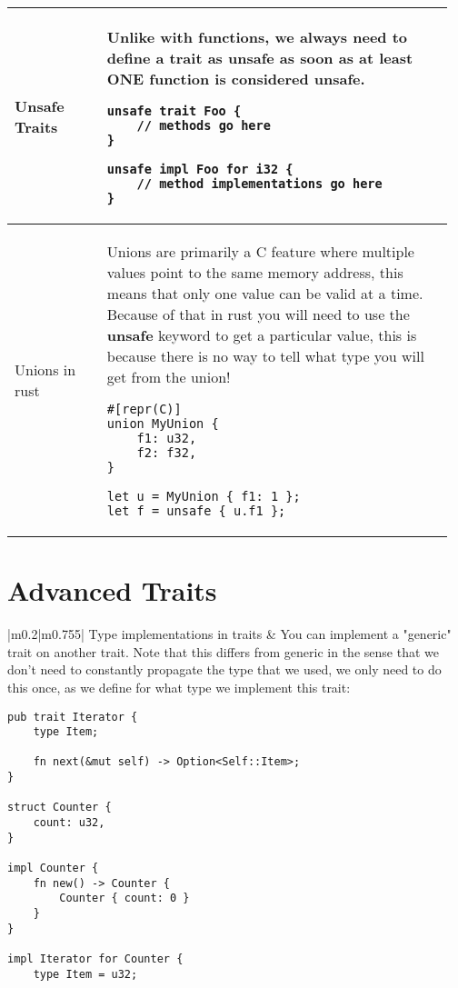 \documentclass[main.tex,fontsize=8pt,paper=a4,paper=portrait,DIV=calc,]{scrartcl}
\begin{document}
\begin{table}[ht!]
\begin{tabular}{|m{0.2\linewidth}|m{0.755\linewidth}|}
\hline
Unsafe Traits & 
Unlike with functions, we \textbf{always need to define a trait as unsafe as soon as at least ONE function is considered unsafe.}\newline
\begin{lstlisting}
unsafe trait Foo {
    // methods go here
}

unsafe impl Foo for i32 {
    // method implementations go here
}
\end{lstlisting}\\
\hline
Unions in rust & 
Unions are primarily a C feature where multiple values point to the same memory address, this means that only one value can be valid at a time.\newline
Because of that in rust you will need to use the \textbf{unsafe} keyword to get a particular value, this is because there is no way to tell what type you will get from the union!\newline
\begin{lstlisting}
#[repr(C)]
union MyUnion {
    f1: u32,
    f2: f32,
}

let u = MyUnion { f1: 1 };
let f = unsafe { u.f1 };
\end{lstlisting}\\
\hline
\end{tabular}
\section{Advanced Traits}
\begin{tabular}{|m{0.2\linewidth}|m{0.755\linewidth}|}
\hline
Type implementations in traits & 
You can implement a "generic" trait on another trait.\newline
Note that this differs from generic in the sense that we don't need to constantly propagate the type that we used, we only need to do this once, as we define for what type we implement this trait:\newline
\begin{lstlisting}
pub trait Iterator {
    type Item;

    fn next(&mut self) -> Option<Self::Item>;
}

struct Counter {
    count: u32,
}

impl Counter {
    fn new() -> Counter {
        Counter { count: 0 }
    }
}

impl Iterator for Counter {
    type Item = u32;


\end{lstlisting}
\end{tabular}
\end{table}
\end{document}
